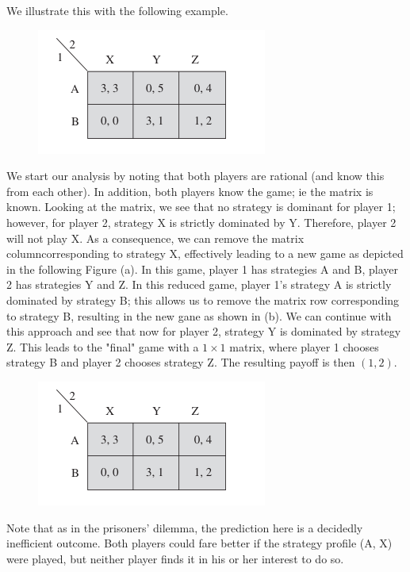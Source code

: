 We illustrate this with the following example.

\begin{figure}[H]
    \centering
    \includegraphics[scale=0.7]{images/2023-11-21-game_theory_03.png}
\end{figure}


We start our analysis by noting that both players are rational (and know this from each other). In addition, both players know the game; ie the matrix is known. Looking at the matrix, we see that no strategy is dominant for player 1; however, for player 2, strategy X is strictly dominated by Y. Therefore, player 2 will not play X. As a consequence, we can remove the matrix columncorresponding to strategy X, effectively leading to a new game as depicted in the following Figure (a). In this game, player 1 has strategies A and B, player 2 has strategies Y and Z. In this reduced game, player 1's strategy A is strictly dominated by strategy B; this allows us to remove the matrix row corresponding to strategy B, resulting in the new gane as shown in (b). We can continue with this approach and see that now for player 2, strategy Y is dominated by strategy Z. This leads to the "final" game with a $1 \times 1 $ matrix, where player 1 chooses strategy B and player 2 chooses strategy Z. The resulting payoff is then $(1,2)$.

\begin{figure}[H]
    \centering
    \includegraphics[scale=0.7]{images/2023-11-21-game_theory_03.png}
\end{figure}

Note that as in the prisoners’ dilemma, the prediction here is a decidedly inefficient outcome. Both players could fare better if the strategy profile
(A, X) were played, but neither player finds it in his or her interest to do so.

